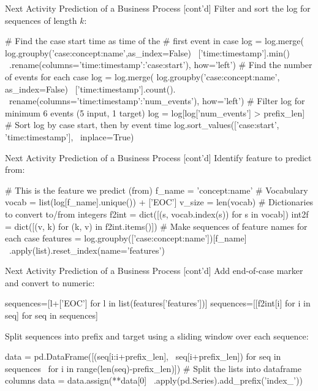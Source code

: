 \documentclass[ignorenonframetext,xcolor=x11names]{beamer}
\begin{document}
\begin{frame}[fragile]{Next Activity Prediction of a Business Process \small [cont'd]}
Filter and sort the log for sequences of length $k$:
\begin{pythoncode}
# Find the case start time as time of the 
# first event in case
log = log.merge( 
    log.groupby('case:concept:name',as_index=False) \
    ['time:timestamp'].min() \
    .rename(columns={'time:timestamp':'case:start'}), 
    how='left')
# Find the number of events for each case
log = log.merge( 
    log.groupby('case:concept:name', as_index=False) \
    ['time:timestamp'].count(). \
    rename(columns={'time:timestamp':'num_events'}), 
    how='left')
# Filter log for minimum 6 events (5 input, 1 target)
log = log[log['num_events'] > prefix_len]
# Sort log by case start, then by event time
log.sort_values(['case:start', 'time:timestamp'], \
    inplace=True)
\end{pythoncode}
\end{frame}


\begin{frame}[fragile]{Next Activity Prediction of a Business Process \small [cont'd]}
Identify feature to predict from:
\begin{pythoncode}
# This is the feature we predict (from)
f_name = 'concept:name'
# Vocabulary
vocab = list(log[f_name].unique()) + ['EOC']
v_size = len(vocab)
# Dictionaries to convert to/from integers
f2int = dict([(s, vocab.index(s)) for s in vocab])
int2f = dict([(v, k) for (k, v) in f2int.items()])
# Make sequences of feature names for each case
features = log.groupby(['case:concept:name'])[f_name] \
    .apply(list).reset_index(name='features')
\end{pythoncode}
\end{frame}


\begin{frame}[fragile]{Next Activity Prediction of a Business Process \small [cont'd]}
Add end-of-case marker and convert to numeric:
\begin{pythoncode}
sequences=[l+['EOC'] for l in list(features['features'])]
sequences=[[f2int[i] for i in seq] for seq in sequences]
\end{pythoncode}
Split sequences into prefix and target using a sliding window over each sequence:
\begin{pythoncode}
data = pd.DataFrame([(seq[i:i+prefix_len], \
    seq[i+prefix_len]) for seq in sequences \
    for i in range(len(seq)-prefix_len)])
# Split the lists into dataframe columns
data = data.assign(**data[0] \
    .apply(pd.Series).add_prefix('index_'))
\end{pythoncode}
\end{frame}
\end{document}
